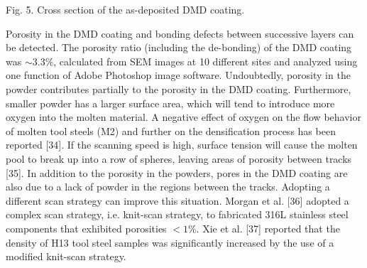 \documentclass[10pt]{article}
\begin{document}
Fig. 5. Cross section of the as-deposited DMD coating.

Porosity in the DMD coating and bonding defects between successive layers can be detected. The porosity ratio (including the de-bonding) of the DMD coating was $\sim 3.3 \%$, calculated from SEM images at 10 different sites and analyzed using one function of Adobe Photoshop image software. Undoubtedly, porosity in the powder contributes partially to the porosity in the DMD coating. Furthermore, smaller powder has a larger surface area, which will tend to introduce more oxygen into the molten material. A negative effect of oxygen on the flow behavior of molten tool steels (M2) and further on the densification process has been reported [34]. If the scanning speed is high, surface tension will cause the molten pool to break up into a row of spheres, leaving areas of porosity between tracks [35]. In addition to the porosity in the powders, pores in the DMD coating are also due to a lack of powder in the regions between the tracks. Adopting a different scan strategy can improve this situation. Morgan et al. [36] adopted a complex scan strategy, i.e. knit-scan strategy, to fabricated 316L stainless steel components that exhibited porosities $<1 \%$. Xie et al. [37] reported that the density of H13 tool steel samples was significantly increased by the use of a modified knit-scan strategy.
\end{document}
